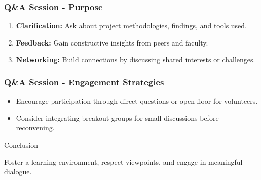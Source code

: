 \documentclass[aspectratio=169]{beamer}
\begin{document}
\begin{frame}[fragile]
    \frametitle{Q\&A Session - Purpose}
    \begin{enumerate}
        \item \textbf{Clarification:} Ask about project methodologies, findings, and tools used.
        \item \textbf{Feedback:} Gain constructive insights from peers and faculty.
        \item \textbf{Networking:} Build connections by discussing shared interests or challenges.
    \end{enumerate}
\end{frame}

\begin{frame}[fragile]
    \frametitle{Q\&A Session - Engagement Strategies}
    \begin{itemize}
        \item Encourage participation through direct questions or open floor for volunteers.
        \item Consider integrating breakout groups for small discussions before reconvening.
    \end{itemize}
    \begin{block}{Conclusion}
        \item Foster a learning environment, respect viewpoints, and engage in meaningful dialogue.
    \end{block}
\end{frame}
\end{document}
